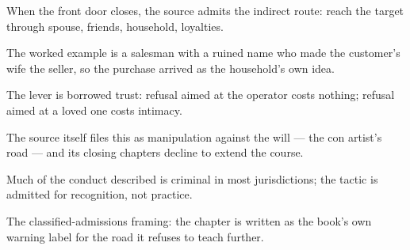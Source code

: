 

\begin{distilled}
  \item When the front door closes, the source admits the indirect route: reach the target through spouse, friends, household, loyalties.
  \item The worked example is a salesman with a ruined name who made the customer's wife the seller, so the purchase arrived as the household's own idea.
  \item The lever is borrowed trust: refusal aimed at the operator costs nothing; refusal aimed at a loved one costs intimacy.
  \item The source itself files this as manipulation against the will --- the con artist's road --- and its closing chapters decline to extend the course.
  \item Much of the conduct described is criminal in most jurisdictions; the tactic is admitted for recognition, not practice.
\end{distilled}
\begin{unique}
  \item The classified-admissions framing: the chapter is written as the book's own warning label for the road it refuses to teach further.
\end{unique}
